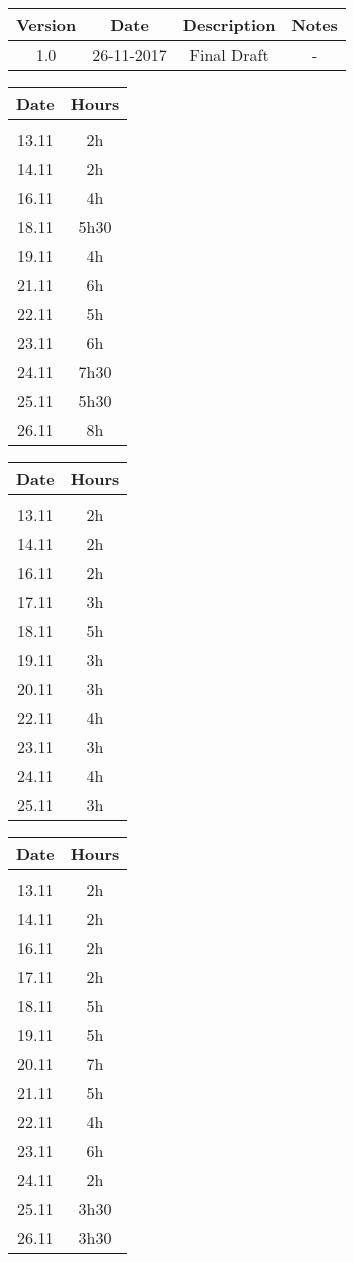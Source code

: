 
\vspace{0.5cm}
\begin{tabular}[H]{c|c|c|c}
	Version & Date & Description & Notes\\
	\hline
	\rule{0pt}{4ex}1.0	&	26-11-2017	&	Final Draft	&	-
\end{tabular}

\vspace{0.5cm}
\begin{tabular}[H]{c|c}
	Date & Hours\\
	\hline\\
	13.11	&	2h\\
	14.11	&	2h\\
	16.11	&	4h\\
	18.11	&	5h30\\
	19.11	&	4h\\
	21.11	&	6h\\
	22.11	&	5h\\
	23.11	&	6h\\
	24.11	&	7h30\\
	25.11	&	5h30\\
	26.11	&	8h
\end{tabular}

\vspace{0.5cm}
\begin{tabular}[H]{c|c}
	Date & Hours\\
	\hline\\
	13.11	&	2h\\
	14.11	&	2h\\
	16.11	&	2h\\
	17.11	&	3h\\
	18.11	&	5h\\
	19.11	&	3h\\
	20.11	&	3h\\
	22.11	&	4h\\
	23.11	&	3h\\
	24.11	&	4h\\
	25.11	&	3h
\end{tabular}

\vspace{0.5cm}
\begin{tabular}[H]{c|c}
	Date & Hours\\
	\hline\\
	13.11	&	2h\\
	14.11	&	2h\\
	16.11	&	2h\\
	17.11	&	2h\\
	18.11	&	5h\\
	19.11	&	5h\\
	20.11	&	7h\\
	21.11	&	5h\\
	22.11	&	4h\\
	23.11	&	6h\\
	24.11	&	2h\\
	25.11	&	3h30\\
	26.11	&	3h30
\end{tabular}